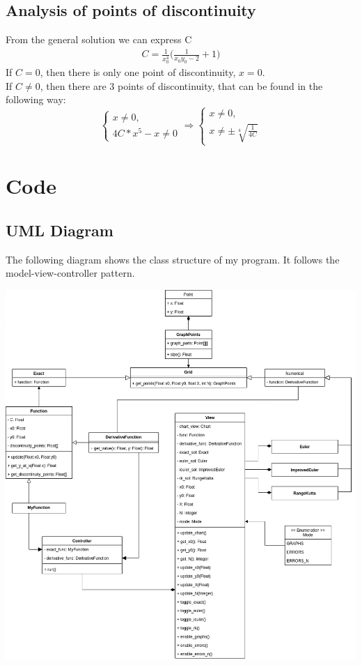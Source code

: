 \documentclass[12pt]{article}
\begin{document}
\subsection*{Analysis of points of discontinuity}
From the general solution we can express C 
\begin{gather*}
    C = \frac{1}{x_0^4} \Bigg( \frac{1}{x_0y_0-2} + 1 \Bigg)
\end{gather*}
If $C = 0$, then there is only one point of discontinuity, $x=0$. \\
If $C \neq 0$, then there are 3 points of discontinuity, that can be found
in the following way:
$$
\begin{cases}
        x \neq 0, \\
        4C*x^5 - x \neq 0
\end{cases}
\Rightarrow
\begin{cases}
        x \neq 0, \\
        x \neq \pm \sqrt[4]{ \frac{1}{4C} }
\end{cases}
$$

\newpage
\section*{Code}
\subsection*{UML Diagram}

The following diagram shows the class structure of my program.
It follows the model-view-controller pattern.

\includegraphics[scale=0.4]{resources/UML.png}
\newpage
\end{document}
